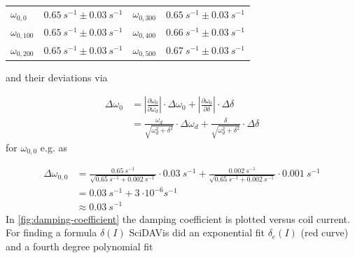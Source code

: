         \begin{table}[h]
            \centering
            \caption[Angular natural frequencies]{}
            \begin{tabular}{@{}llll@{}}
                \toprule
                $\omega_{0,0}$      &$\SI{0.65}{s^{-1}} \pm \SI{0.03}{s^{-1}}$  &\hspace{10mm}$\omega_{0,300}$   &$\SI{0.65}{s^{-1}} \pm \SI{0.03}{s^{-1}}$\\
                $\omega_{0,100}$    &$\SI{0.65}{s^{-1}} \pm \SI{0.03}{s^{-1}}$  &\hspace{10mm}$\omega_{0,400}$   &$\SI{0.66}{s^{-1}} \pm \SI{0.03}{s^{-1}}$\\
                $\omega_{0,200}$    &$\SI{0.65}{s^{-1}} \pm \SI{0.03}{s^{-1}}$  &\hspace{10mm}$\omega_{0,500}$   &$\SI{0.67}{s^{-1}} \pm \SI{0.03}{s^{-1}}$\\
                \bottomrule
            \end{tabular}
            \label{tab:angular_natural_frequencies}
        \end{table}
        and their deviations via\par
        \begin{align}
            \Delta\omega_0  &=\left| \frac{\partial\omega_0}{\partial\omega_d} \right| \cdot \Delta\omega_0 + \left| \frac{\partial\omega_0}{\partial\delta} \right| \cdot \Delta\delta \nonumber\\
                            &=\frac{\omega_d}{\sqrt{\omega_d^2+\delta^2}} \cdot \Delta\omega_d + \frac{\delta}{\sqrt{\omega_d^2+\delta^2}} \cdot \Delta\delta
        \end{align}
        for $ \omega_{0,0} $ e.g. as\par
        \begin{align*}
            \Delta\omega_{0,0}  &=\frac{\SI{0.65}{s^{-1}}}{\sqrt{\SI{0.65}{s^{-1}}+\SI{0.002}{s^{-1}}}} \cdot \SI{0.03}{s^{-1}} + \frac{\SI{0.002}{s^{-1}}}{\sqrt{\SI{0.65}{s^{-1}}+\SI{0.002}{s^{-1}}}} \cdot \SI{0.001}{s^{-1}}\\
                                &=\SI{0.03}{s^{-1}}+\SI{3}{\cdot10^{-6}s^{-1}}\\
                                &\approx\SI{0.03}{s^{-1}}
        \end{align*}
        In \cref{fig:damping-coefficient} the damping coefficient is plotted versus coil current. For finding a formula
        $ \delta(I) $ SciDAVis did an exponential fit $ \delta_e(I) $ (red curve) and a fourth degree polynomial fit
